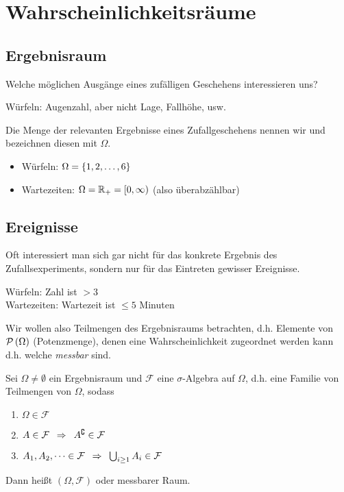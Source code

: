 \section{Wahrscheinlichkeitsräume}
\subsection*{Ergebnisraum}
Welche möglichen Ausgänge eines zufälligen Geschehens interessieren uns?
\begin{*beispiel}
    Würfeln: Augenzahl, aber nicht Lage, Fallhöhe, usw.
\end{*beispiel}

\begin{definition}[Ergebnisraum]
    Die Menge der relevanten Ergebnisse eines Zufallgeschehens nennen wir  und bezeichnen diesen mit $\Omega$.
\end{definition}

\begin{*beispiel}
    \begin{itemize}
        \item Würfeln: $\Omega = \left\{ 1,2, \dots , 6 \right\}$
        \item Wartezeiten: $\Omega = \mathbb{R}_+ = [0,\infty)$ (also überabzählbar)
    \end{itemize}
\end{*beispiel}

\subsection*{Ereignisse}
Oft interessiert man sich gar nicht für das konkrete Ergebnis des Zufallsexperiments, sondern nur für das Eintreten gewisser Ereignisse.

\begin{*beispiel}
    Würfeln: Zahl ist $> 3$ \\
    Wartezeiten: Wartezeit ist $\leq 5$ Minuten
\end{*beispiel}

Wir wollen also Teilmengen des Ergebnisraums betrachten, d.h. Elemente von $\mathcal{P}\left( \Omega \right)$ (Potenzmenge), denen eine Wahrscheinlichkeit zugeordnet werden kann d.h. welche \textit{messbar} sind.

\begin{definition}[Ereignisraum]
    Sei $\Omega \neq \emptyset$ ein Ergebnisraum und $\mathcal{F}$ eine $\sigma$-Algebra auf $\Omega$, d.h. eine Familie von Teilmengen von $\Omega$, sodass 
    \begin{enumerate}
        \item $\Omega \in \mathcal F$
        \item $A \in \mathcal{F} \enskip \Rightarrow \enskip A^\complement \in \mathcal{F}$
        \item $A_1, A_2, \dots \in \mathcal{F} \enskip \Rightarrow \enskip \bigcup_{i \geq 1} A_i \in \mathcal{F}$
    \end{enumerate}
    Dann heißt $(\Omega, \mathcal{F})$  oder messbarer Raum.
\end{definition}


